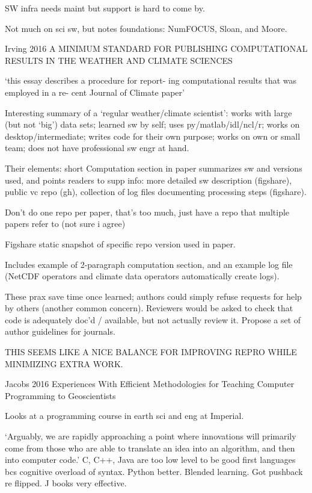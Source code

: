 \documentclass[12pt]{amsart}
\begin{document}
SW infra needs maint but support is hard to come by.

Not much on sci sw, but notes foundations: NumFOCUS, Sloan, and Moore.





Irving 2016 A MINIMUM STANDARD FOR PUBLISHING COMPUTATIONAL RESULTS IN THE WEATHER AND CLIMATE SCIENCES

`this essay describes a procedure for report- ing computational results that was employed in a re- cent Journal of Climate paper' 

Interesting summary of a `regular weather/climate scientist': works with large (but not `big') data sets; learned sw by self; uses py/matlab/idl/ncl/r; works on desktop/intermediate; writes code for their own purpose; works on own or small team; does not have professional sw engr at hand.

Their elements: short Computation section in paper summarizes sw and versions used, and points readers to supp info: more detailed sw description (figshare), public vc repo (gh), collection of log files documenting processing steps (figshare). 

Don't do one repo per paper, that's too much, just have a repo that multiple papers refer to (not sure i agree)

Figshare static snapshot of specific repo version used in paper. 

Includes example of 2-paragraph computation section, and an example log file (NetCDF operators and climate data operators automatically create logs).

These prax save time once learned; authors could simply refuse requests for help by others (another common concern). Reviewers would be asked to check that code is adequately doc'd / available, but not actually review it. Propose a set of author guidelines for journals.

THIS SEEMS LIKE A NICE BALANCE FOR IMPROVING REPRO WHILE MINIMIZING EXTRA WORK.









Jacobs 2016 Experiences With Efficient Methodologies for Teaching Computer Programming to Geoscientists

Looks at a programming course in earth sci and eng at Imperial. 

`Arguably, we are rapidly approaching a point where innovations will primarily come from those who are able to translate an idea into an algorithm, and then into computer code.' C, C++, Java are too low level to be good first languages bcs cognitive overload of syntax. Python better. Blended learning. Got pushback re flipped. J books very effective.
\end{document}
